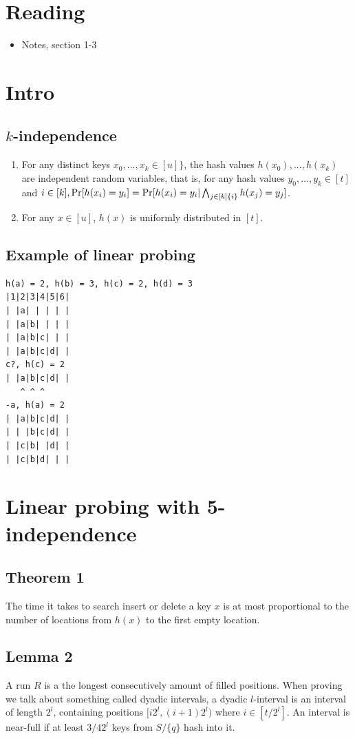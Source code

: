 \documentclass[a4paper, fleqn]{article}
\begin{document}
\section*{Reading}
\begin{itemize}
    \item Notes, section 1-3
\end{itemize}
\tableofcontents
\section{Intro}
\subsection{$k$-independence}
\begin{enumerate}
  \item For any distinct keys $x_0,...,x_k \in [u]\}$, the hash values $h(x_0),...,h(x_k)$ are independent random variables, that is, for any hash values $y_0,...,y_k \in [t]$ and $i \in [k], \Pr[h(x_i)=y_i] = \Pr[h(x_i) = y_i | \bigwedge_{j\in[k]\\\{i\}} h(x_j) = y_j]$.
  \item For any $x \in [u]$, $h(x)$ is uniformly distributed in $[t]$.
\end{enumerate}
\subsection{Example of linear probing}
\begin{verbatim}
h(a) = 2, h(b) = 3, h(c) = 2, h(d) = 3
|1|2|3|4|5|6|
| |a| | | | |
| |a|b| | | |
| |a|b|c| | |
| |a|b|c|d| |
c?, h(c) = 2
| |a|b|c|d| |
   ^ ^ ^
-a, h(a) = 2
| |a|b|c|d| |
| | |b|c|d| |
| |c|b| |d| |
| |c|b|d| | |
\end{verbatim}
\section{Linear probing with 5-independence}
\subsection{Theorem 1}
The time it takes to search insert or delete a key $x$ is at most proportional to the number of locations from $h(x)$ to the first empty location.
\subsection{Lemma 2}
A run $R$ is a the longest consecutively amount of filled positions. When proving we talk about something called dyadic intervals, a dyadic $l$-interval is an interval of length $2^l$, containing positions $[i2^l,(i+1)2^l)$ where $i \in [t/2^l]$. An interval is near-full if at least $3/4 2^l$ keys from $S/\{q\}$ hash into it.
\end{document}
